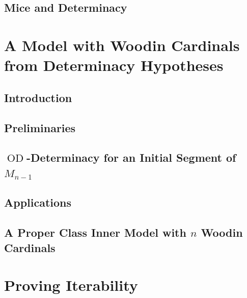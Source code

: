 \documentclass[11pt]{amsart}
\numberwithin{subsection}{section}
\newcommand{\OD}{\ensuremath{\operatorname{OD}} }
\theoremstyle{definition}
\theoremstyle{remark}
\begin{document}


\subsection{Mice and Determinacy}



\section[Woodin Cardinals
  from Determinacy Hypotheses]{A Model with Woodin Cardinals
  from Determinacy Hypotheses}
\label{ch:WCFromDet}



\subsection{Introduction}
\label{sec:introKS}



\subsection{Preliminaries}
\label{sec:prepKS}



\subsection{$\OD$-Determinacy for an Initial Segment of $M_{n-1}$}



\subsection{Applications}
\label{sec:CorollarysFromKS}



\subsection{A Proper Class Inner Model with $n$ Woodin Cardinals}
\label{sec:SteelsArgumentProj}



\section{Proving Iterability}
\label{ch:it}
\end{document}
